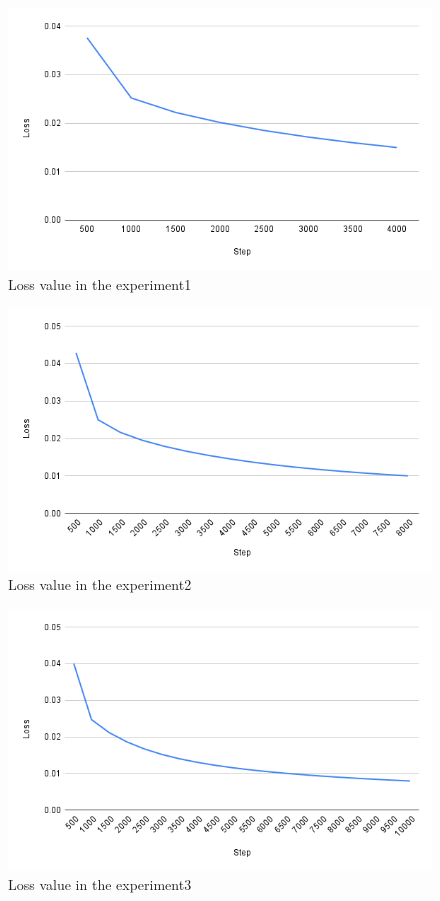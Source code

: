 \newpage
\begin{figure}[h]
  \centering
  \includegraphics[keepaspectratio, scale=0.31]{images/exp3-4000.png}
  \caption{Loss value in the experiment1}
  \label{Fig:exp3-4000}
  \end{figure}

\begin{figure}[h]
  \centering
  \includegraphics[keepaspectratio, scale=0.31]{images/exp3-8000.png}
  \caption{Loss value in the experiment2}
  \label{Fig:exp3-8000}
  \end{figure}

\begin{figure}[h]
  \centering
  \includegraphics[keepaspectratio, scale=0.31]{images/exp3-10000.png}
  \caption{Loss value in the experiment3}
  \label{Fig:exp3-10000}
  \end{figure}

